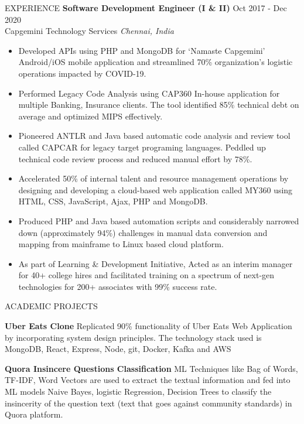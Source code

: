\documentclass{resume} %
\begin{document}
\begin{rSection}{EXPERIENCE}
\vspace{-0.5em}
\textbf{Software Development Engineer (I \& II)} \hfill Oct  2017 - Dec 2020\\
Capgemini Technology Services \hfill \textit{Chennai, India}
 \begin{itemize}
    \itemsep -6pt {} 
     \item Developed APIs using PHP and MongoDB for ‘Namaste Capgemini’ Android/iOS mobile application and streamlined 70\% organization’s logistic operations impacted by COVID-19.
     \item 	Performed Legacy Code Analysis using CAP360 In-house application for multiple Banking, Insurance clients. The tool identified 85\% technical debt on average and optimized MIPS effectively. 
     \item Pioneered ANTLR and Java based automatic code analysis and review tool called CAPCAR for legacy target programing languages. Peddled up technical code review process and reduced manual effort by 78\%.
     \item Accelerated 50\% of internal talent and resource management operations by designing and developing a cloud-based web application called MY360 using HTML, CSS, JavaScript, Ajax, PHP and MongoDB.
     \item Produced PHP and Java based automation scripts and considerably narrowed down (approximately 94\%) challenges in manual data conversion and mapping from mainframe to Linux based cloud platform.
     \item As part of Learning \& Development Initiative, Acted as an interim manager for 40+ college hires and facilitated training on a spectrum of next-gen technologies for 200+ associates with 99\% success rate.
 \end{itemize}

\end{rSection} 

\vspace{-0.5em}
\begin{rSection}{ACADEMIC PROJECTS}
\vspace{-1.5em}
\item \textbf{Uber Eats Clone}  {Replicated 90\%  functionality of Uber Eats Web Application by  incorporating system design principles. The technology stack used is MongoDB, React, Express, Node, git, Docker, Kafka and AWS }
  \vspace{-0.1em}
\item \textbf{Quora Insincere Questions Classification  }  {ML Techniques like Bag of Words, TF-IDF, Word Vectors are used to extract the textual information and fed into ML models Naive Bayes, logistic Regression, Decision Trees to classify the insincerity of the question text (text that goes against community standards) in Quora platform.  }
  \vspace{-0.2em}
\end{rSection} 
\end{document}
